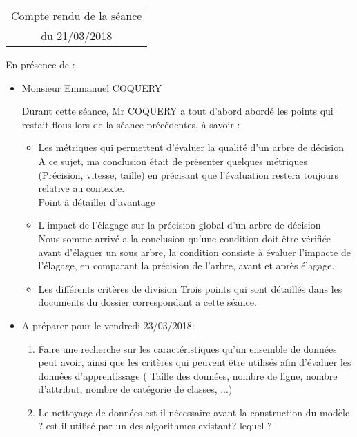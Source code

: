 \documentclass[a4paper, 11pt]{report}
\begin{document}
 
\begin{center}
\begin{tabular}{|c|}
\hline
Compte rendu de la séance \\du 21\//03\//2018\\
\hline

\end{tabular}
\end{center}


En présence de :\\
\begin{itemize}
\item Monsieur Emmanuel COQUERY

Durant cette séance, Mr COQUERY a tout d'abord abordé les points qui restait flous lors de la séance précédentes, à savoir : 
\begin{itemize}
\item Les métriques qui permettent d'évaluer la qualité d'un arbre de décision\\
A ce sujet, ma conclusion était de présenter quelques métriques (Précision, vitesse, taille) en précisant que l'évaluation restera toujours relative au contexte.\\
Point à détailler d'avantage
\item L'impact de l'élagage sur la précision global d'un arbre de décision\\
Nous somme arrivé a la conclusion qu'une condition doit être vérifiée avant d'élaguer un sous arbre, la condition consiste à évaluer l'impacte de l'élagage, en comparant la précision de l'arbre, avant et après élagage.
\item Les différents critères de division
Trois points qui sont détaillés dans les documents du dossier correspondant a cette séance.
\end{itemize}

\item A préparer pour le vendredi 23/03/2018:\\
\begin{enumerate}
\item Faire une recherche sur les caractéristiques qu'un ensemble de données peut avoir, ainsi que les critères qui peuvent être utilisés afin d'évaluer les données d'apprentissage ( Taille des données, nombre de ligne, nombre d'attribut, nombre de catégorie de classes, ...)

\item Le nettoyage de données est-il nécessaire avant la construction du modèle ? est-il utilisé par un des algorithmes existant? lequel ? 

\end{enumerate}

\end{itemize}
\end{document}
